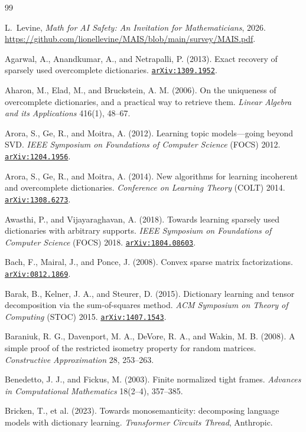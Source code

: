 \documentclass[11pt]{amsart}
\newcommand{\arxiv}[1]{\href{https://arxiv.org/abs/#1}{\texttt{arXiv:#1}}}
\theoremstyle{plain}
\theoremstyle{definition}
\begin{document}
\begin{thebibliography}{99}

L.~Levine,
\emph{Math for AI Safety: An Invitation for Mathematicians},
2026. \url{https://github.com/lionellevine/MAIS/blob/main/survey/MAIS.pdf}.


 Agarwal, A., Anandkumar, A., and Netrapalli, P. (2013). Exact recovery of sparsely used overcomplete dictionaries. \arxiv{1309.1952}.

 Aharon, M., Elad, M., and Bruckstein, A. M. (2006). On the uniqueness of overcomplete dictionaries, and a practical way to retrieve them. \emph{Linear Algebra and its Applications} 416(1), 48--67.

 Arora, S., Ge, R., and Moitra, A. (2012). Learning topic models---going beyond SVD. \emph{IEEE Symposium on Foundations of Computer Science} (FOCS) 2012. \arxiv{1204.1956}.

 Arora, S., Ge, R., and Moitra, A. (2014). New algorithms for learning incoherent and overcomplete dictionaries. \emph{Conference on Learning Theory} (COLT) 2014. \arxiv{1308.6273}.

 Awasthi, P., and Vijayaraghavan, A. (2018). Towards learning sparsely used dictionaries with arbitrary supports. \emph{IEEE Symposium on Foundations of Computer Science} (FOCS) 2018. \arxiv{1804.08603}.

 Bach, F., Mairal, J., and Ponce, J. (2008). Convex sparse matrix factorizations. \arxiv{0812.1869}.

 Barak, B., Kelner, J. A., and Steurer, D. (2015). Dictionary learning and tensor decomposition via the sum-of-squares method. \emph{ACM Symposium on Theory of Computing} (STOC) 2015. \arxiv{1407.1543}.

 Baraniuk, R. G., Davenport, M. A., DeVore, R. A., and Wakin, M. B. (2008). A simple proof of the restricted isometry property for random matrices. \emph{Constructive Approximation} 28, 253--263.

 Benedetto, J. J., and Fickus, M. (2003). Finite normalized tight frames. \emph{Advances in Computational Mathematics} 18(2--4), 357--385.

 Bricken, T., et al. (2023). Towards monosemanticity: decomposing language models with dictionary learning. \emph{Transformer Circuits Thread}, Anthropic.


\end{thebibliography}
\end{document}
